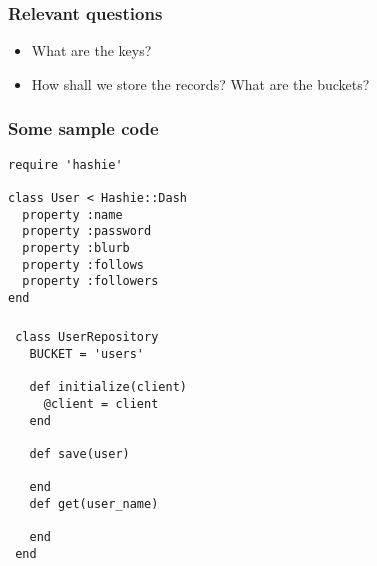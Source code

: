 \documentclass[10pt]{beamer}
\begin{document}
\begin{frame}
  \frametitle{Relevant questions}

 \begin{itemize}
  \item What are the keys?
  \item How shall we store the records?  What are the buckets?
 \end{itemize}

\end{frame}


\begin{frame}[fragile]
  \frametitle{Some sample code}

 \begin{verbatim}
require 'hashie'

class User < Hashie::Dash
  property :name
  property :password
  property :blurb
  property :follows
  property :followers
end
 \end{verbatim}

\end{frame}



\begin{frame}[fragile]
  \frametitle{}

 \begin{verbatim}
 class UserRepository
   BUCKET = 'users'

   def initialize(client)
     @client = client
   end

   def save(user)

   end
   def get(user_name)

   end
 end

 \end{verbatim}

\end{frame}
\end{document}
